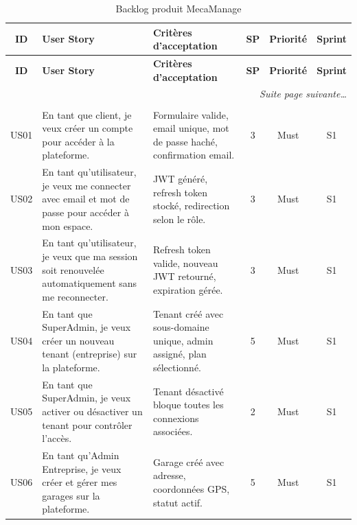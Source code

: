 \documentclass[12pt,a4paper]{report}
\begin{document}
\begin{longtable}{|c|p{4.5cm}|p{5.5cm}|c|c|c|}
\caption{Backlog produit MecaManage} \label{tab:backlog} \\
\hline
\rowcolor{primary!20}
\textbf{ID} & \textbf{User Story} & \textbf{Crit\`{e}res d'acceptation}
  & \textbf{SP} & \textbf{Priorit\'{e}} & \textbf{Sprint} \\
\hline
\endfirsthead
\hline
\rowcolor{primary!20}
\textbf{ID} & \textbf{User Story} & \textbf{Crit\`{e}res d'acceptation}
  & \textbf{SP} & \textbf{Priorit\'{e}} & \textbf{Sprint} \\
\hline
\endhead
\hline
\multicolumn{6}{r}{\textit{Suite page suivante\ldots}} \\
\endfoot
\hline
\endlastfoot

\multicolumn{6}{|c|}{\cellcolor{primary!30}
  \textbf{EPIC 1 --- Authentification et Gestion Multi-tenant}} \\
\hline

US01 &
  En tant que client, je veux cr\'{e}er un compte pour acc\'{e}der
  \`{a} la plateforme. &
  Formulaire valide, email unique, mot de passe hach\'{e},
  confirmation email. &
  3 & Must & S1 \\
\hline

US02 &
  En tant qu'utilisateur, je veux me connecter avec email et mot de
  passe pour acc\'{e}der \`{a} mon espace. &
  JWT g\'{e}n\'{e}r\'{e}, refresh token stock\'{e}, redirection selon
  le r\^{o}le. &
  3 & Must & S1 \\
\hline

US03 &
  En tant qu'utilisateur, je veux que ma session soit renouvel\'{e}e
  automatiquement sans me reconnecter. &
  Refresh token valide, nouveau JWT retourn\'{e}, expiration g\'{e}r\'{e}e. &
  3 & Must & S1 \\
\hline

US04 &
  En tant que SuperAdmin, je veux cr\'{e}er un nouveau tenant
  (entreprise) sur la plateforme. &
  Tenant cr\'{e}\'{e} avec sous-domaine unique, admin assign\'{e},
  plan s\'{e}lectionn\'{e}. &
  5 & Must & S1 \\
\hline

US05 &
  En tant que SuperAdmin, je veux activer ou d\'{e}sactiver un tenant
  pour contr\^{o}ler l'acc\`{e}s. &
  Tenant d\'{e}sactiv\'{e} bloque toutes les connexions associ\'{e}es. &
  2 & Must & S1 \\
\hline

US06 &
  En tant qu'Admin Entreprise, je veux cr\'{e}er et g\'{e}rer mes
  garages sur la plateforme. &
  Garage cr\'{e}\'{e} avec adresse, coordonn\'{e}es GPS, statut actif. &
  5 & Must & S1 \\
\hline


\end{longtable}
\end{document}
